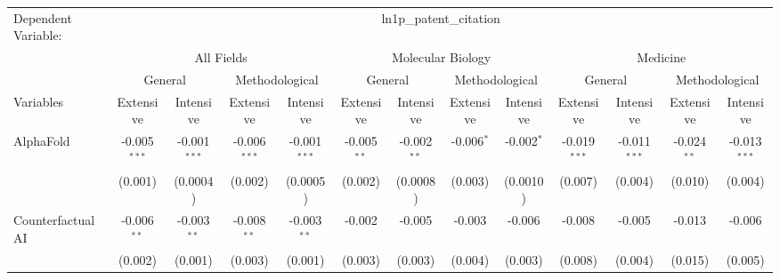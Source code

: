 \begingroup
\centering
\begin{tabular}{lcccccccccccc}
   \tabularnewline \midrule \midrule
   Dependent Variable: & \multicolumn{12}{c}{ln1p\_patent\_citation}\\
 & \multicolumn{4}{c}{All Fields} & \multicolumn{4}{c}{Molecular Biology} & \multicolumn{4}{c}{Medicine} \\
\cmidrule(lr){2-5} \cmidrule(lr){6-9} \cmidrule(lr){10-13}
 & \multicolumn{2}{c}{General} & \multicolumn{2}{c}{Methodological} & \multicolumn{2}{c}{General} & \multicolumn{2}{c}{Methodological} & \multicolumn{2}{c}{General} & \multicolumn{2}{c}{Methodological} \\
\cmidrule(lr){2-3} \cmidrule(lr){4-5} \cmidrule(lr){6-7} \cmidrule(lr){8-9} \cmidrule(lr){10-11} \cmidrule(lr){12-13}
Variables & \multicolumn{1}{c}{Extensive} & \multicolumn{1}{c}{Intensive} & \multicolumn{1}{c}{Extensive} & \multicolumn{1}{c}{Intensive} & \multicolumn{1}{c}{Extensive} & \multicolumn{1}{c}{Intensive} & \multicolumn{1}{c}{Extensive} & \multicolumn{1}{c}{Intensive} & \multicolumn{1}{c}{Extensive} & \multicolumn{1}{c}{Intensive} & \multicolumn{1}{c}{Extensive} & \multicolumn{1}{c}{Intensive} \\
\cmidrule(lr){1-1}\cmidrule(lr){2-2} \cmidrule(lr){3-3} \cmidrule(lr){4-4} \cmidrule(lr){5-5} \cmidrule(lr){6-6} \cmidrule(lr){7-7} \cmidrule(lr){8-8} \cmidrule(lr){9-9} \cmidrule(lr){10-10} \cmidrule(lr){11-11} \cmidrule(lr){12-12} \cmidrule(lr){13-13}
   AlphaFold                                & -0.005$^{***}$ & -0.001$^{***}$  & -0.006$^{***}$ & -0.001$^{***}$  & -0.005$^{**}$ & -0.002$^{**}$ & -0.006$^{*}$ & -0.002$^{*}$ & -0.019$^{***}$ & -0.011$^{***}$ & -0.024$^{**}$ & -0.013$^{***}$\\   
                                            & (0.001)        & (0.0004)        & (0.002)        & (0.0005)        & (0.002)       & (0.0008)      & (0.003)      & (0.0010)     & (0.007)        & (0.004)        & (0.010)       & (0.004)\\   
   Counterfactual AI                        & -0.006$^{**}$  & -0.003$^{**}$   & -0.008$^{**}$  & -0.003$^{**}$   & -0.002        & -0.005        & -0.003       & -0.006       & -0.008         & -0.005         & -0.013        & -0.006\\   
                                            & (0.002)        & (0.001)         & (0.003)        & (0.001)         & (0.003)       & (0.003)       & (0.004)      & (0.003)      & (0.008)        & (0.004)        & (0.015)       & (0.005)\\   

\end{tabular}

